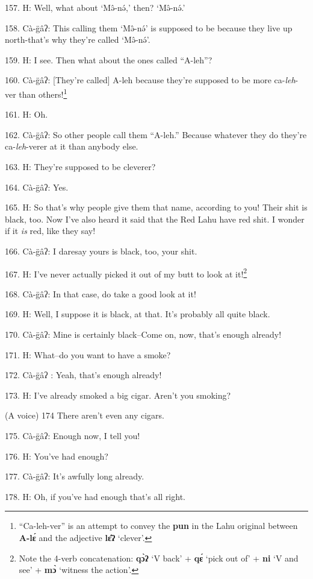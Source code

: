 157. H: Well, what about `Mə̂-nə́,' then? `Mə̂-nə́.'

158. Cà-g̈âʔ: This calling them `Mə̂-nə́' is supposed to be because they
live up north-that's why they're called `Mə̂-nə́'.

159. H: I see. Then what about the ones called ``A-leh''?

160. Cà-g̈âʔ: [They're called] A-leh because they're supposed to be more ca-\textit{leh}-ver
than others!\footnote{``Ca-leh-ver'' is an attempt to convey the \textbf{pun} in the Lahu original between \textbf{A-lɛ́} and the adjective \textbf{lɛ̂ʔ} `clever'.}

161. H: Oh.

162. Cà-g̈âʔ: So other people call them ``A-leh.'' Because
whatever they do they're ca-\textit{leh}-verer at it than anybody else.

163. H: They're supposed to be cleverer?

164. Cà-g̈âʔ: Yes.

165. H: So that's why people give them that name, according to you! Their shit is
black, too. Now I've also heard it said that the Red Lahu have red shit. I wonder
if it \textit{is }red, like they say!

166. Cà-g̈âʔ: I daresay yours is black, too, your shit.

167. H: I've never actually picked it out of my butt to look at it!\footnote{Note the 4-verb concatenation: \textbf{qɔ̀ʔ} `V back' + \textbf{qɛ́} `pick out of' + \textbf{ni} `V and see' + \textbf{mɔ̀} `witness the action'.}

\begin{center}
\end{center}

168. Cà-g̈âʔ: In that case, do take a good look at it!

169. H: Well, I suppose it is black, at that. It's probably all quite black.

170. Cà-g̈âʔ: Mine is certainly black--Come on, now, that's enough already!

171. H: What--do you want to have a smoke?

172. Cà-g̈âʔ : Yeah, that's enough already!

173. H: I've already smoked a big cigar. Aren't you smoking?

(A voice) 174 There aren't even any cigars.

175. Cà-g̈âʔ: Enough now, I tell you!

176. H: You've had enough?

177. Cà-g̈âʔ: It's awfully long already.

178. H: Oh, if you've had enough that's all right.

